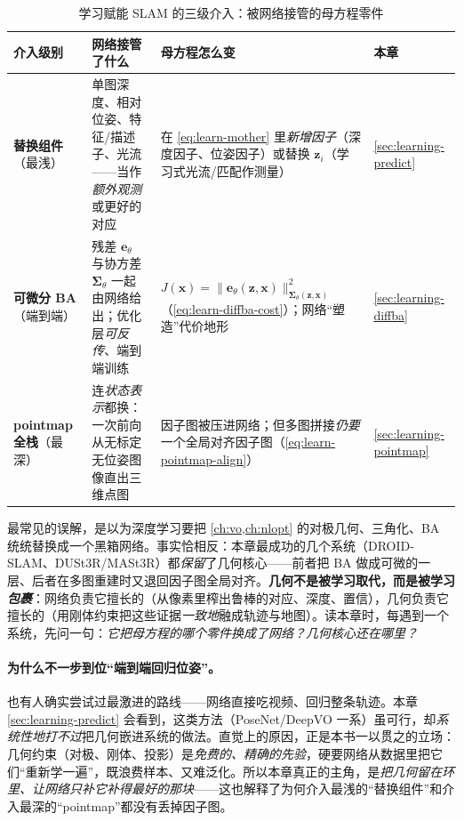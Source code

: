 \begin{table}[H]\centering\small
\caption{学习赋能 SLAM 的三级介入：被网络接管的母方程零件}
\label{tab:learn-spectrum}
\begin{tabular}{p{} p{} p{} p{}}
\toprule
介入级别 & 网络接管了什么 & 母方程怎么变 & 本章 \\
\midrule
\textbf{替换组件}\newline（最浅） & 单图深度、相对位姿、特征/描述子、光流——当作\emph{额外观测}或更好的对应 & 在 \cref{eq:learn-mother} 里\emph{新增因子}（深度因子、位姿因子）或替换 $\mathbf{z}_i$（学习式光流/匹配作测量） & \cref{sec:learning-predict} \\
\textbf{可微分 BA}\newline（端到端） & 残差 $\mathbf{e}_\theta$ 与协方差 $\boldsymbol\Sigma_\theta$ 一起由网络给出；优化层\emph{可反传}、端到端训练 & $J(\mathbf{x})=\|\mathbf{e}_\theta(\mathbf{z},\mathbf{x})\|^2_{\boldsymbol\Sigma_\theta(\mathbf{z},\mathbf{x})}$（\cref{eq:learn-diffba-cost}）；网络“塑造”代价地形 & \cref{sec:learning-diffba} \\
\textbf{pointmap 全栈}\newline（最深） & 连\emph{状态表示}都换：一次前向从无标定无位姿图像直出三维点图 & 因子图被压进网络；但多图拼接\emph{仍要}一个全局对齐因子图（\cref{eq:learn-pointmap-align}） & \cref{sec:learning-pointmap} \\
\bottomrule
\end{tabular}
\end{table}

\begin{pitfall}
最常见的误解，是以为深度学习要把 \cref{ch:vo,ch:nlopt} 的对极几何、三角化、BA 统统替换成一个黑箱网络。事实恰相反：本章最成功的几个系统（DROID-SLAM、DUSt3R/MASt3R）都\emph{保留}了几何核心——前者把 BA 做成可微的一层、后者在多图重建时又退回因子图全局对齐。\textbf{几何不是被学习取代，而是被学习\emph{包裹}}：网络负责它擅长的（从像素里榨出鲁棒的对应、深度、置信），几何负责它擅长的（用刚体约束把这些证据\emph{一致地}融成轨迹与地图）。读本章时，每遇到一个系统，先问一句：\emph{它把母方程的哪个零件换成了网络？几何核心还在哪里？}
\end{pitfall}

\paragraph{为什么不一步到位“端到端回归位姿”。}
也有人确实尝试过最激进的路线——网络直接吃视频、回归整条轨迹。本章 \cref{sec:learning-predict} 会看到，这类方法（PoseNet/DeepVO 一系）虽可行，却\emph{系统性地打不过}把几何嵌进系统的做法\cite{teed2026boosting}。直觉上的原因，正是本书一以贯之的立场：几何约束（对极、刚体、投影）是\emph{免费的、精确的先验}，硬要网络从数据里把它们“重新学一遍”，既浪费样本、又难泛化。所以本章真正的主角，是\emph{把几何留在环里、让网络只补它补得最好的那块}——这也解释了为何介入最浅的“替换组件”和介入最深的“pointmap”都没有丢掉因子图。


